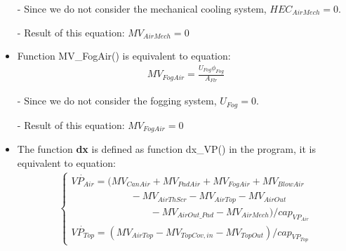 \documentclass[a4paper]{article}
\numberwithin{equation}{section}
\begin{document}
\begin{itemize}
  \item[-] Since we do not consider the mechanical cooling system, \(HEC_{AirMech} = 0\).
  \item[-] Result of this equation: \(MV_{AirMech} = 0\)

  \item Function MV\_FogAir() is equivalent to equation:
        \begin{align*}
          MV_{FogAir} = \frac{U_{Fog} \phi_{Fog}}{A_{Flr}}
        \end{align*}

  \item[-] Since we do not consider the fogging system, \(U_{Fog} = 0\).
  \item[-] Result of this equation: \(MV_{FogAir} = 0\)

  \item The function \textbf{dx} is defined as function dx\_VP() in the program, it is equivalent to equation:
        \begin{align*}
          \begin{cases}
            \dot{VP_{Air}} = (MV_{CanAir} + MV_{PadAir} + MV_{FogAir} + MV_{BlowAir} \\ \qquad \qquad \qquad
            - MV_{AirThScr} - MV_{AirTop} - MV_{AirOut}                              \\ \qquad \qquad \qquad \qquad
            - MV_{AirOut\_Pad} - MV_{AirMech}) / cap_{VP_{Air}}                      \\
            \dot{VP_{Top}} = (MV_{AirTop} - MV_{TopCov,in} - MV_{TopOut}) / cap_{VP_{Top}}
          \end{cases}
        \end{align*}


\end{itemize}
\end{document}
